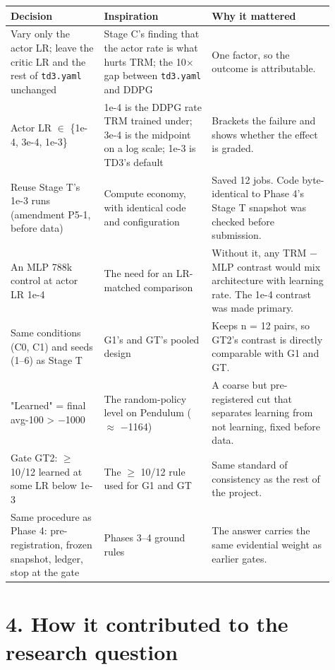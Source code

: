 \documentclass[11pt]{article}
\begin{document}
\begin{center}\small\begin{tabular}{>{\raggedright\arraybackslash}p{0.261\linewidth}>{\raggedright\arraybackslash}p{0.301\linewidth}>{\raggedright\arraybackslash}p{0.344\linewidth}}
\toprule
Decision & Inspiration & Why it mattered \\
\midrule
Vary only the actor LR; leave the critic LR and the rest of \texttt{td3.yaml} unchanged & Stage C's finding that the actor rate is what hurts TRM; the 10$\times$ gap between \texttt{td3.yaml} and DDPG & One factor, so the outcome is attributable. \\
Actor LR $\in$ \{1e-4, 3e-4, 1e-3\} & 1e-4 is the DDPG rate TRM trained under; 3e-4 is the midpoint on a log scale; 1e-3 is TD3's default & Brackets the failure and shows whether the effect is graded. \\
Reuse Stage T's 1e-3 runs (amendment P5-1, before data) & Compute economy, with identical code and configuration & Saved 12 jobs. Code byte-identical to Phase 4's Stage T snapshot was checked before submission. \\
An MLP 788k control at actor LR 1e-4 & The need for an LR-matched comparison & Without it, any TRM $-$ MLP contrast would mix architecture with learning rate. The 1e-4 contrast was made primary. \\
Same conditions (C0, C1) and seeds (1--6) as Stage T & G1's and GT's pooled design & Keeps n = 12 pairs, so GT2's contrast is directly comparable with G1 and GT. \\
"Learned" = final avg-100 > $-$1000 & The random-policy level on Pendulum ($\approx$ $-$1164) & A coarse but pre-registered cut that separates learning from not learning, fixed before data. \\
Gate GT2: $\geq$ 10/12 learned at some LR below 1e-3 & The $\geq$ 10/12 rule used for G1 and GT & Same standard of consistency as the rest of the project. \\
Same procedure as Phase 4: pre-registration, frozen snapshot, ledger, stop at the gate & Phases 3--4 ground rules & The answer carries the same evidential weight as earlier gates. \\
\bottomrule
\end{tabular}\end{center}



\section*{4. How it contributed to the research question}
\end{document}
